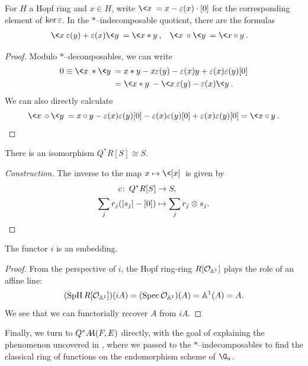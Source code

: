 \begin{lemma}\label{ArithmeticInQAst}
For \(H\) a Hopf ring and \(x \in H\), write \(\<x\> = x - \eps(x) \cdot [0]\) for the corresponding element of \(\ker \eps\).
In the \(\ast\)--indecomposable quotient, there are the formulas
\begin{align*}
\<x\>\eps(y) + \eps(x)\<y\> & = \<x \ast y\>, &
\<x\> \circ \<y\> & = \<x \circ y\>.
\end{align*}
\end{lemma}
\begin{proof}
Modulo \(\ast\)--decomposables, we can write
\begin{align*}
0 \equiv \<x\> \ast \<y\> & = x \ast y - x \eps(y) - \eps(x) y + \eps(x) \eps(y) [0] \\
& = \<x \ast y\> - \<x\>\eps(y) - \eps(x)\<y\>.
\end{align*}
We can also directly calculate \[\<x\> \circ \<y\> = x \circ y - \eps(x) \eps(y) [0] - \eps(x) \eps(y) [0] + \eps(x) \eps(y) [0] = \<x \circ y\>. \qedhere\]
\end{proof}

\begin{corollary}\label{QAstAndTensors}
There is an isomorphism \(Q^* R[S] \cong S\).
\end{corollary}
\begin{proof}[Construction]
The inverse to the map \(x \mapsto \<[x]\>\) is given by
\begin{align*}
c\co Q^* R[S] & \to S, \\
\sum_j r_j ([s_j] - [0]) & \mapsto \sum_j r_j \otimes s_j. \qedhere
\end{align*}
\end{proof}

\begin{corollary}\label{iEmbeds}
The functor \(i\) is an embedding.
\end{corollary}
\begin{proof}
From the perspective of \(i\), the Hopf ring-ring \(R[\sheaf O_{\mathbb A^1}]\) plays the role of an affine line: \[(\SpH R[\sheaf O_{\mathbb A^1}])(iA) = (\Spec \sheaf O_{\mathbb A^1})(A) = \mathbb A^1(A) = A.\]
We see that we can functorially recover \(A\) from \(iA\).
\end{proof}


Finally, we turn to \(Q^* \AA(F, E)\) directly, with the goal of explaining the phenomenon uncovered in , where we passed to the \(\ast\)--indecomposables to find the classical ring of functions on the endomorphism scheme of \(\G_a\).

